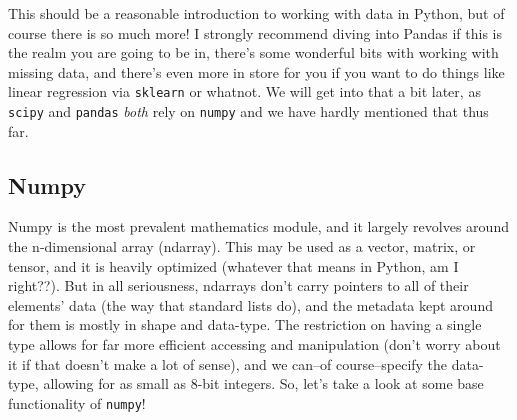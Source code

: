\documentclass[11pt, twoside, reqno]{book}
\begin{document}
This should be a reasonable introduction to working with data in Python, but of course there is so much more! I strongly recommend diving into Pandas if this is the realm you are going to be in, there's some wonderful bits with working with missing data, and there's even more in store for you if you want to do things like linear regression via \texttt{sklearn} or whatnot. We will get into that a bit later, as \texttt{scipy} and \texttt{pandas} \textit{both} rely on \texttt{numpy} and we have hardly mentioned that thus far.

\subsection{Numpy}

Numpy is the most prevalent mathematics module, and it largely revolves around the n-dimensional array (ndarray). This may be used as a vector, matrix, or tensor, and it is heavily optimized (whatever that means in Python, am I right??). But in all seriousness, ndarrays don't carry pointers to all of their elements' data (the way that standard lists do), and the metadata kept around for them is mostly in shape and data-type. The restriction on having a single type allows for far more efficient accessing and manipulation (don't worry about it if that doesn't make a lot of sense), and we can--of course--specify the data-type, allowing for as small as 8-bit integers. So, let's take a look at some base functionality of \texttt{numpy}!
\end{document}
